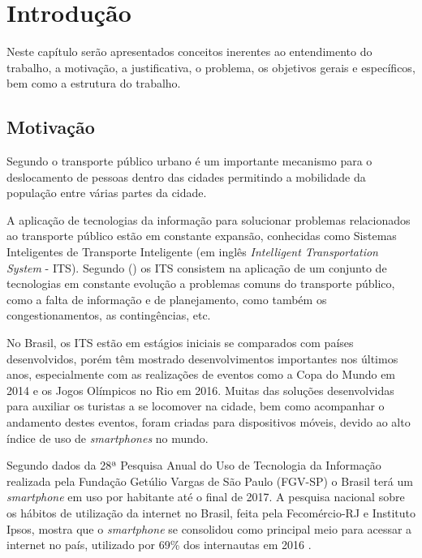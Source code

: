 \chapter{Introdução}

Neste capítulo serão apresentados conceitos inerentes ao entendimento do trabalho, a motivação, a justificativa, o problema, os objetivos gerais e específicos, bem como a estrutura do trabalho.

\section{Motivação}

Segundo  o transporte público urbano é um importante mecanismo para o deslocamento de pessoas dentro das cidades permitindo a mobilidade da população entre várias partes da cidade.

A aplicação de tecnologias da informação para solucionar problemas relacionados ao transporte público estão em constante expansão, conhecidas como Sistemas Inteligentes de Transporte Inteligente (em inglês \textit{Intelligent Transportation System} - ITS). Segundo \citeauthor{associacao-nacional} (\citeyear{associacao-nacional}) os ITS consistem na aplicação de um conjunto de tecnologias em constante evolução a problemas comuns do transporte público, como a falta de informação e de planejamento, como também os congestionamentos, as contingências, etc. 

No Brasil, os ITS estão em estágios iniciais se comparados com países desenvolvidos, porém têm mostrado desenvolvimentos importantes nos últimos anos, especialmente com as realizações de eventos como a Copa do Mundo em 2014 e os Jogos Olímpicos no Rio em 2016\cite{alvarado-campos}. Muitas das soluções desenvolvidas para auxiliar os turistas a se locomover na cidade, bem como acompanhar o andamento destes eventos, foram criadas para dispositivos móveis, devido ao alto índice de uso de \textit{smartphones} no mundo.

Segundo dados da 28ª Pesquisa Anual do Uso de Tecnologia da Informação realizada pela Fundação Getúlio Vargas de São Paulo (FGV-SP) o Brasil terá um \textit{smartphone} em uso por habitante até o final de 2017. A pesquisa nacional sobre os hábitos de utilização da internet no Brasil, feita pela Fecomércio-RJ e Instituto Ipsos, mostra que o \textit{smartphone} se consolidou como principal meio para acessar a internet no país, utilizado por 69\% dos internautas em 2016 \cite{agencia-brasil}.

